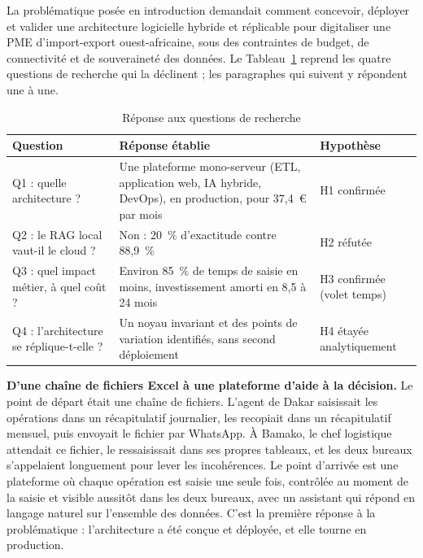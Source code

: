 La problématique posée en introduction demandait comment concevoir, déployer et valider une architecture logicielle hybride et réplicable pour digitaliser une PME d'import-export ouest-africaine, sous des contraintes de budget, de connectivité et de souveraineté des données. Le Tableau~\ref{tab:reponse_questions} reprend les quatre questions de recherche qui la déclinent ; les paragraphes qui suivent y répondent une à une.

\begin{table}[H]
\centering
\footnotesize
\caption{Réponse aux questions de recherche}
\label{tab:reponse_questions}
\begin{tabularx}{\linewidth}{|l|>{\raggedright\arraybackslash}X|l|}
\hline
\rowcolor[HTML]{EFEFEF}
\textbf{Question} & \textbf{Réponse établie} & \textbf{Hypothèse} \\ \hline
Q1 : quelle architecture ? & Une plateforme mono-serveur (ETL, application web, IA hybride, DevOps), en production, pour 37,4~€ par mois & H1 confirmée \\ \hline
Q2 : le RAG local vaut-il le cloud ? & Non : 20~\% d'exactitude contre 88,9~\% & H2 réfutée \\ \hline
Q3 : quel impact métier, à quel coût ? & Environ 85~\% de temps de saisie en moins, investissement amorti en 8,5 à 24 mois & H3 confirmée (volet temps) \\ \hline
Q4 : l'architecture se réplique-t-elle ? & Un noyau invariant et des points de variation identifiés, sans second déploiement & H4 étayée analytiquement \\ \hline
\end{tabularx}
\end{table}

\textbf{D'une chaîne de fichiers Excel à une plateforme d'aide à la décision.} Le point de départ était une chaîne de fichiers. L'agent de Dakar saisissait les opérations dans un récapitulatif journalier, les recopiait dans un récapitulatif mensuel, puis envoyait le fichier par WhatsApp. À Bamako, le chef logistique attendait ce fichier, le ressaisissait dans ses propres tableaux, et les deux bureaux s'appelaient longuement pour lever les incohérences. Le point d'arrivée est une plateforme où chaque opération est saisie une seule fois, contrôlée au moment de la saisie et visible aussitôt dans les deux bureaux, avec un assistant qui répond en langage naturel sur l'ensemble des données. C'est la première réponse à la problématique : l'architecture a été conçue et déployée, et elle tourne en production.

